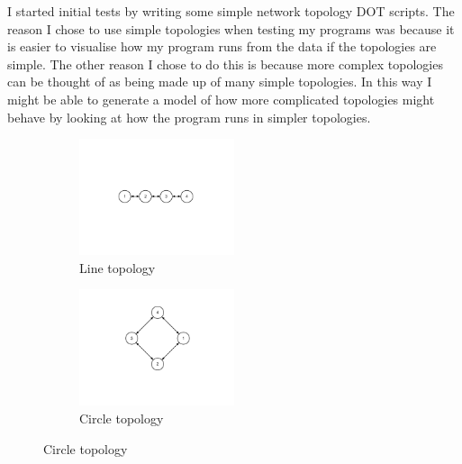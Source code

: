 \documentclass[12pt]{article}
\begin{document}
I started initial tests by writing some simple network topology DOT
scripts. The reason I chose to use simple topologies
when testing my programs was  because it is easier to
visualise how my program runs from the data if the topologies
are simple. The other reason I chose to do this is because
more complex topologies can be thought of as being made up
of many simple topologies. In this way I might be able to
generate a model of how more complicated topologies might
behave by looking at how the program runs in simpler
topologies.
\begin{figure}[htp]
    \begin{subfigure}[b]{0.5\textwidth}
        \centering
        \includegraphics[clip,trim=45mm 60mm 45mm 60mm,width=0.5\textwidth]{images/line-topo.pdf}
        \caption{Line topology}
        \label{fig:line_topology}
    \end{subfigure}
    \begin{subfigure}[b]{0.5\textwidth}
        \centering
        \includegraphics[clip,trim=45mm 40mm 45mm 20mm,width=0.5\textwidth]{images/circle-topo.pdf}
        \caption{Circle topology}
        \label{fig:circle_topology}
    \end{subfigure}


\end{figure}
\end{document}
